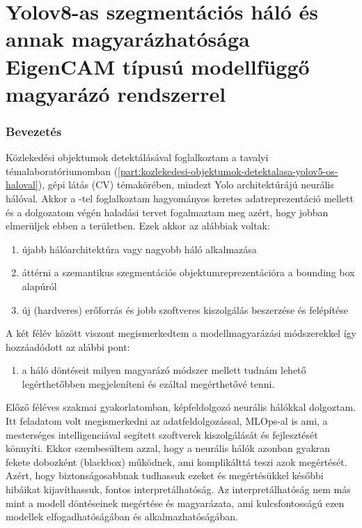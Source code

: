 \documentclass[12pt,oneside,a4paper]{article}
\newcommand{\newsection}[1]{\clearpage\section{#1}}\label{makro}
\theoremstyle{remark}
\begin{document}
\part{Yolov8-as szegmentációs háló és annak magyarázhatósága EigenCAM típusú modellfüggő magyarázó rendszerrel}\label{part:yolov8-as-szegmentacios-halo-es-annak-magyarazhatosaga-eigencam-tipusu-modellfuggo-magyarazo-rendszerrel}
\setcounter{section}{0}
\newsection{Bevezetés}\label{sec:bevezetes}
\pagestyle{fancy}
    Közlekedési objektumok detektálásával foglalkoztam a tavalyi témalaboratóriumomban (\ref{part:kozlekedesi-objektumok-detektalasa-yolov5-os-haloval}),
     gépi látás (\ac{CV}) témakörében, mindezt Yolo architektúrájú neurális hálóval.
    Akkor a -tel foglalkoztam hagyományos keretes adatreprezentáció mellett és a dolgozatom végén
     haladási tervet fogalmaztam meg azért, hogy jobban elmerüljek ebben a területben.
Ezek akkor az alábbiak voltak:
\begin{enumerate}[label=\alph*., start=1]\label{enum:tervek}
    \item újabb hálóarchitektúra vagy nagyobb háló alkalmazása
    \item áttérni a szemantikus szegmentációs objektumreprezentációra a bounding box alapúról
    \item új (hardveres) erőforrás és jobb szoftveres kiszolgálás beszerzése és felépítése
\end{enumerate}
A két félév között viszont megismerkedtem a modellmagyarázási módszerekkel így hozzáadódott az alábbi pont:
\begin{enumerate}[label=\alph*., start=4]
    \item a háló döntéseit milyen magyarázó módszer mellett tudnám lehető legérthetőbben megjeleníteni és ezáltal megérthetővé tenni.
\end{enumerate}

    Előző féléves szakmai gyakorlatomban, képfeldolgozó neurális hálókkal dolgoztam.
    Itt feladatom volt megismerkedni az adatfeldolgozással, MLOps-al is ami, a mesterséges intelligenciával segített
    szoftverek kiszolgálását és fejlesztését könnyíti.
    Ekkor szembesültem azzal, hogy a neurális hálók azonban gyakran fekete dobozként (blackbox) működnek,
    ami komplikálttá teszi azok megértését.
    Azért, hogy biztonságosabbnak tudhassuk ezeket
    és megértésükkel későbbi hibáikat kijavíthassuk, fontos interpretálhatóság.
    Az interpretálhatóság nem más mint a modell döntéseinek megértése
    és magyarázata, ami kulcsfontosságú ezen modellek elfogadhatóságában és alkalmazhatóságában.
\end{document}

